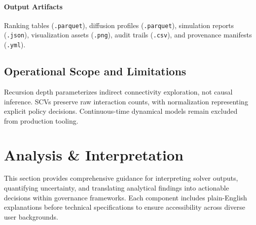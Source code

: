 \documentclass[12pt]{article}
\theoremstyle{plain}
\begin{document}
\paragraph{Output Artifacts} 
Ranking tables (\texttt{.parquet}), diffusion profiles (\texttt{.parquet}), simulation reports (\texttt{.json}), visualization assets (\texttt{.png}), audit trails (\texttt{.csv}), and provenance manifests (\texttt{.yml}).

\subsection{Operational Scope and Limitations}
Recursion depth parameterizes indirect connectivity exploration, not causal inference. SCVs preserve raw interaction counts, with normalization representing explicit policy decisions. Continuous-time dynamical models remain excluded from production tooling.

\section{Analysis \& Interpretation}
\label{sec:analysis}
\noindent This section provides comprehensive guidance for interpreting solver outputs, quantifying uncertainty, and translating analytical findings into actionable decisions within governance frameworks. Each component includes plain-English explanations before technical specifications to ensure accessibility across diverse user backgrounds.
\end{document}
